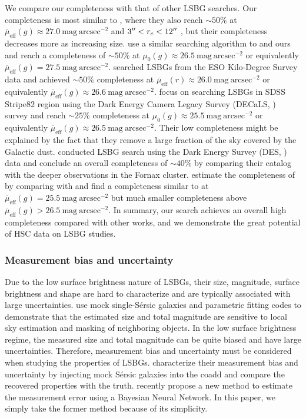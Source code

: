 \documentclass[twocolumn,astrosymb,twocolappendix]{aastex631}
\newcommand{\sbunit}{\mathrm{mag\ arcsec}^{-2}}
\newcommand{\sbeff}{\overline{\mu}_{\mathrm{eff}}(g)}
\newcommand{\sbeffr}{\overline{\mu}_{\mathrm{eff}}(r)}
\newcommand{\sersic}{S\'ersic}
\begin{document}
\begin{CJK*}{UTF8}{gbsn}
We compare our completeness with that of other LSBG searches. Our completeness is most similar to , where they also reach $\sim 50\%$ at $\sbeff \approx 27.0\ \sbunit$ and $3\mbox{$^{\prime\prime}$} < r_e < 12\mbox{$^{\prime\prime}$}$ \citep{Kado-Fong2021,Greene2022}, but their completeness decreases more as increasing size. \citet{CarlstenELVES2022} use a similar searching algorithm to  and ours and reach a completeness of $\sim 50\%$ at $\mu_0(g)\approx 26.5\ \sbunit$ or equivalently $\sbeff = 27.5\ \sbunit$. \citet{vdBurg2017} searched LSBGs from the ESO Kilo-Degree Survey data and achieved $\sim 50\%$ completeness at $\sbeffr\approx 26.0\ \sbunit$ or equivalently $\sbeff \approx 26.6\ \sbunit$. \citet{Zaritsky2021} focus on searching LSBGs in SDSS Stripe82 region using the Dark Energy Camera Legacy Survey (DECaLS, \citealt{Dey2019}) survey and reach $\sim 25\%$ completeness at $\mu_{0}(g) \approx 25.5\ \sbunit$ or equivalently $\sbeff \approx 26.5\ \sbunit$. Their low completeness might be explained by the fact that they remove a large fraction of the sky covered by the Galactic dust. \citet{Tanoglidis2021} conducted LSBG search using the Dark Energy Survey (DES, \citealt{Abbot2018}) data and conclude an overall completeness of $\sim 40\%$ by comparing their catalog with the deeper observations in the Fornax cluster. \citet{Kado-Fong2021} estimate the completeness of \citet{Tanoglidis2021} by comparing with  and find a completeness similar to  at $\sbeff = 25.5\ \sbunit$ but much smaller completeness above $\sbeff > 26.5\ \sbunit$. In summary, our search achieves an overall high completeness compared with other works, and we demonstrate the great potential of HSC data on LSBG studies. 



\subsubsection{Measurement bias and uncertainty}\label{sec:meas_unc}

Due to the low surface brightness nature of LSBGs, their size, magnitude, surface brightness and shape are hard to characterize and are typically associated with large uncertainties. \citet{Haussler2007} use mock single-\sersic{} galaxies and parametric fitting codes to demonstrate that the estimated size and total magnitude are sensitive to local sky estimation and masking of neighboring objects. In the low surface brightness regime, the measured size and total magnitude can be quite biased and have large uncertainties. Therefore, measurement bias and uncertainty must be considered when studying the properties of LSBGs. \citet{Zaritsky2021,Zaritsky2022} characterize their measurement bias and uncertainty by injecting mock \sersic{} galaxies into the coadd and compare the recovered properties with the truth. \citet{Tanoglidis2022ICML} recently propose a new method to estimate the measurement error using a Bayesian Neural Network. In this paper, we simply take the former method because of its simplicity. 


\end{CJK*}
\end{document}
